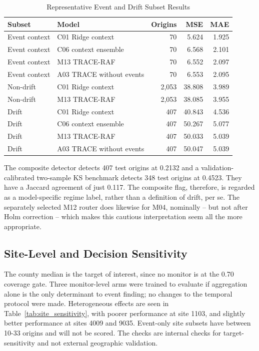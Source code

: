 \documentclass{ieeeaccess}
\begin{document}
\begin{table}[!t]
\centering
\caption{Representative Event and Drift Subset Results}
\label{tab:event_drift_results}
\begin{tabular}{llrrr}
\toprule
Subset & Model & Origins & MSE & MAE \\
\midrule
Event context & C01 Ridge context & 70 & 5.624 & 1.925 \\
Event context & C06 context ensemble & 70 & 6.568 & 2.101 \\
Event context & M13 TRACE-RAF & 70 & 6.552 & 2.097 \\
Event context & A03 TRACE without events & 70 & 6.553 & 2.095 \\
Non-drift & C01 Ridge context & 2,053 & 38.808 & 3.989 \\
Non-drift & M13 TRACE-RAF & 2,053 & 38.085 & 3.955 \\
Drift & C01 Ridge context & 407 & 40.843 & 4.536 \\
Drift & C06 context ensemble & 407 & 50.267 & 5.077 \\
Drift & M13 TRACE-RAF & 407 & 50.033 & 5.039 \\
Drift & A03 TRACE without events & 407 & 50.047 & 5.039 \\
\bottomrule
\end{tabular}
\end{table}

The composite detector detects 407 test origins at 0.2132 and a validation-calibrated two-sample KS benchmark detects 348 test origins at 0.4523. They have a Jaccard agreement of just 0.117. The composite flag, therefore, is regarded as a model-specific regime label, rather than a definition of drift, per se. The separately selected M12 router does likewise for M04, nominally -- but not after Holm correction -- which makes this cautious interpretation seem all the more appropriate.

\subsection{Site-Level and Decision Sensitivity}
The county median is the target of interest, since no monitor is at the 0.70 coverage gate. Three monitor-level arms were trained to evaluate if aggregation alone is the only determinant to event finding; no changes to the temporal protocol were made. Heterogeneous effects are seen in Table~\ref{tab:site_sensitivity}, with poorer performance at site 1103, and slightly better performance at sites 4009 and 9035. Event-only site subsets have between 10-33 origins and will not be scored. The checks are internal checks for target-sensitivity and not external geographic validation.
\end{document}
